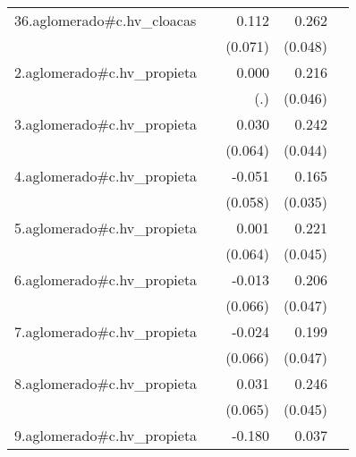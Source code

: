 {\begin{longtable}{l*{4}{D{.}{.}{-1}}}
\addlinespace
36.aglomerado#c.hv\_cloacas&                     &       0.112         &       0.262\sym{***}&                     \\
            &                     &     (0.071)         &     (0.048)         &                     \\
\addlinespace
2.aglomerado#c.hv\_propieta&                     &       0.000         &       0.216\sym{***}&                     \\
            &                     &         (.)         &     (0.046)         &                     \\
\addlinespace
3.aglomerado#c.hv\_propieta&                     &       0.030         &       0.242\sym{***}&                     \\
            &                     &     (0.064)         &     (0.044)         &                     \\
\addlinespace
4.aglomerado#c.hv\_propieta&                     &      -0.051         &       0.165\sym{***}&                     \\
            &                     &     (0.058)         &     (0.035)         &                     \\
\addlinespace
5.aglomerado#c.hv\_propieta&                     &       0.001         &       0.221\sym{***}&                     \\
            &                     &     (0.064)         &     (0.045)         &                     \\
\addlinespace
6.aglomerado#c.hv\_propieta&                     &      -0.013         &       0.206\sym{***}&                     \\
            &                     &     (0.066)         &     (0.047)         &                     \\
\addlinespace
7.aglomerado#c.hv\_propieta&                     &      -0.024         &       0.199\sym{***}&                     \\
            &                     &     (0.066)         &     (0.047)         &                     \\
\addlinespace
8.aglomerado#c.hv\_propieta&                     &       0.031         &       0.246\sym{***}&                     \\
            &                     &     (0.065)         &     (0.045)         &                     \\
\addlinespace
9.aglomerado#c.hv\_propieta&                     &      -0.180\sym{**} &       0.037         &                     \\

\end{longtable}}
